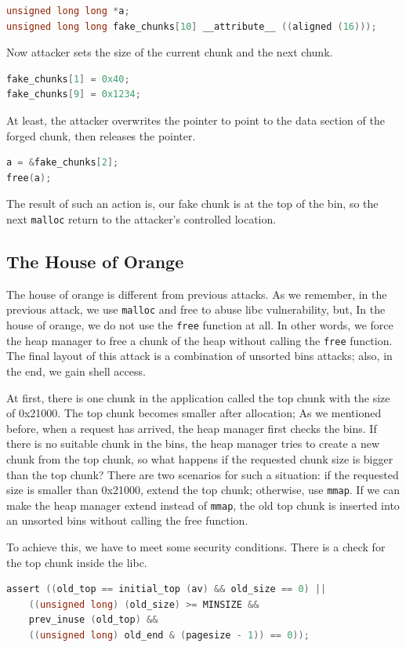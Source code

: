 \documentclass{masterthesis}
\newcommand*\ub{unsorted bins}
\newcommand*\mallocc{\lstinline{malloc}\xspace}
\newcommand*\freec{\lstinline{free}\xspace}
\newcommand*\mmapc{\lstinline{mmap}\xspace}
\begin{document}
\begin{lstlisting}[language=c,frame=tlrb]
unsigned long long *a;
unsigned long long fake_chunks[10] __attribute__ ((aligned (16)));
\end{lstlisting}

Now attacker sets the size of the current chunk and the next chunk.

\begin{lstlisting}[language=c,frame=tlrb]
fake_chunks[1] = 0x40;
fake_chunks[9] = 0x1234;
\end{lstlisting}

At least, the attacker overwrites the pointer to point to the data section of the forged chunk, then releases the pointer.

\begin{lstlisting}[language=c,frame=tlrb]
a = &fake_chunks[2];
free(a);
\end{lstlisting}

The result of such an action is, our fake chunk is at the top of the bin, so the next \mallocc{} return to the attacker's controlled location.

\subsection{The House of Orange}
The house of orange is different from previous attacks. As we remember, in the previous attack, we use \mallocc{} and free to abuse libc vulnerability, but, In the house of orange, we do not use the \freec{} function at all. In other words, we force the heap manager to free a chunk of the heap without calling the \freec{} function. The final layout of this attack is a combination of \ub{} attacks; also, in the end, we gain shell access.

At first, there is one chunk in the application called the top chunk with the size of 0x21000. The top chunk becomes smaller after allocation; As we mentioned before, when a request has arrived, the heap manager first checks the bins. If there is no suitable chunk in the bins, the heap manager tries to create a new chunk from the top chunk, so what happens if the requested chunk size is bigger than the top chunk? There are two scenarios for such a situation: if the requested size is smaller than 0x21000, extend the top chunk; otherwise, use \mmapc{}. If we can make the heap manager extend instead of \mmapc{}, the old top chunk is inserted into an \ub{} without calling the free function.

To achieve this, we have to meet some security conditions. There is a check for the top chunk inside the libc.
\begin{lstlisting}[language=c,frame=tlrb]
 assert ((old_top == initial_top (av) && old_size == 0) ||
	((unsigned long) (old_size) >= MINSIZE &&
	prev_inuse (old_top) &&
	((unsigned long) old_end & (pagesize - 1)) == 0));
\end{lstlisting}
\end{document}
